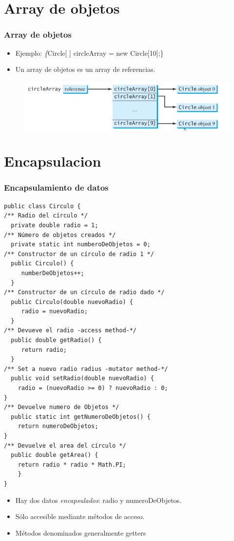 \documentclass{beamer}
\begin{document}
\section{Array de objetos}
\begin{frame}
\frametitle{Array de objetos}
\begin{itemize}[<+->]
\item Ejemplo: \emph \{Circle[ ] circleArray = new Circle[10];\}
\item Un array de objetos es un array de referencias.
\end{itemize} 
\begin{figure}
\includegraphics[scale=0.6]{imagenes/referencia4.png}
\end{figure} 
\end{frame}

\section{Encapsulacion}

\begin{frame}[fragile]
\frametitle{Encapsulamiento de datos} 
\begin{multicols}{2}
\begin{tiny}
\begin{verbatim}
public class Circulo {
/** Radio del círculo */
  private double radio = 1;
/** Número de objetos creados */
  private static int numberoDeObjetos = 0;
/** Constructor de un círculo de radio 1 */
  public Circulo() {
     numberDeObjetos++;
  }
/** Constructor de un círculo de radio dado */
  public Circulo(double nuevoRadio) {
     radio = nuevoRadio;
  }
/** Devueve el radio -access method-*/
  public double getRadio() {
     return radio;
  }
/** Set a nuevo radio radius -mutator method-*/
  public void setRadio(double nuevoRadio) {
    radio = (nuevoRadio >= 0) ? nuevoRadio : 0;
}
/** Devuelve numero de Objetos */
  public static int getNumeroDeObjetos() {
    return numeroDeObjetos;
}
/** Devuelve el area del círculo */
  public double getArea() {
    return radio * radio * Math.PI;
    }
}	
\end{verbatim}
\pause
\begin{itemize}[<+->]
\item Hay dos datos \emph{encapsulados}: radio y numeroDeObjetos.
\item Sólo accesible mediante métodos de acceso.
\item Métodos denominados generalmente \alert{getters}
\end{itemize}
\end{tiny}
\end{multicols}

\end{frame}
\end{document}
